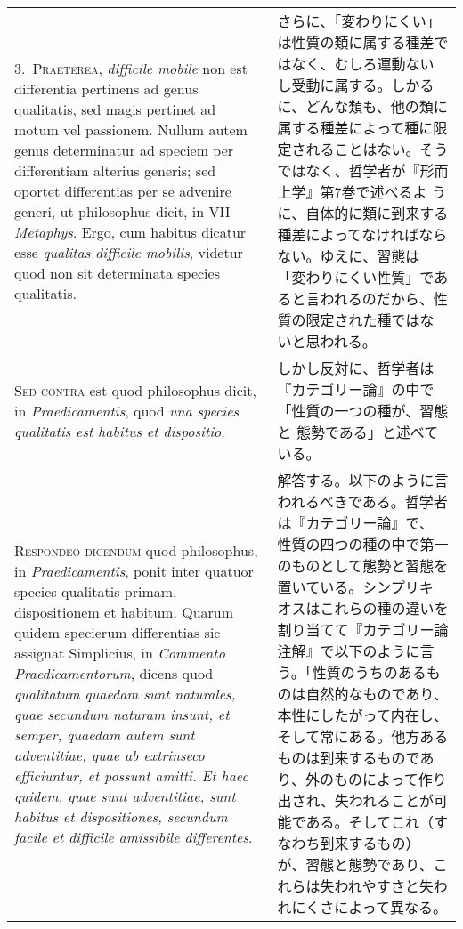 \documentclass[10pt]{jsarticle} %
\begin{document}
\begin{longtable}{p{21em}p{21em}}
3.~{\scshape Praeterea}, {\itshape difficile mobile} non est differentia pertinens ad genus
qualitatis, sed magis pertinet ad motum vel passionem. Nullum autem
genus determinatur ad speciem per differentiam alterius generis; sed
oportet differentias per se advenire generi, ut philosophus dicit, in
VII {\itshape Metaphys}. Ergo, cum habitus dicatur esse {\itshape qualitas difficile
mobilis}, videtur quod non sit determinata species qualitatis.

&

さらに、「変わりにくい」は性質の類に属する種差ではなく、むしろ運動ない
し受動に属する。しかるに、どんな類も、他の類に属する種差によって種に限
定されることはない。そうではなく、哲学者が『形而上学』第7巻で述べるよ
うに、自体的に類に到来する種差によってなければならない。ゆえに、習態は
「変わりにくい性質」であると言われるのだから、性質の限定された種ではな
いと思われる。

\\



{\scshape Sed contra} est quod philosophus dicit, in {\itshape Praedicamentis}, quod {\itshape una
species qualitatis est habitus et dispositio}.

&

しかし反対に、哲学者は『カテゴリー論』の中で「性質の一つの種が、習態と
態勢である」と述べている。

\\



{\scshape Respondeo dicendum} quod philosophus, in {\itshape Praedicamentis}, ponit inter
quatuor species qualitatis primam, dispositionem et habitum. Quarum
quidem specierum differentias sic assignat Simplicius, in {\itshape Commento
Praedicamentorum}, dicens quod {\itshape qualitatum quaedam sunt naturales, quae
secundum naturam insunt, et semper, quaedam autem sunt adventitiae,
quae ab extrinseco efficiuntur, et possunt amitti. Et haec quidem,
quae sunt adventitiae, sunt habitus et dispositiones, secundum facile
et difficile amissibile differentes}. 


&

解答する。以下のように言われるべきである。哲学者は『カテゴリー論』で、
性質の四つの種の中で第一のものとして態勢と習態を置いている。シンプリキ
オスはこれらの種の違いを割り当てて『カテゴリー論注解』で以下のように言
う。「性質のうちのあるものは自然的なものであり、本性にしたがって内在し、
そして常にある。他方あるものは到来するものであり、外のものによって作り
出され、失われることが可能である。そしてこれ（すなわち到来するもの）
が、習態と態勢であり、これらは失われやすさと失われにくさによって異なる。




\end{longtable}
\end{document}
